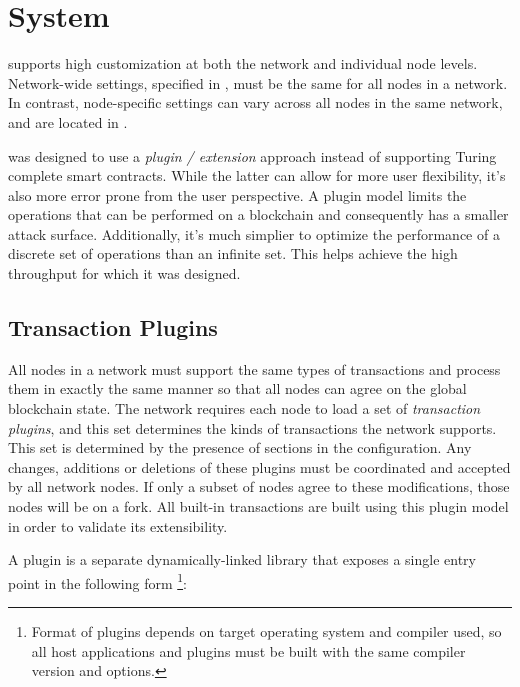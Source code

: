 \section{System}
\label{sec:system}


\codenamechapterfirstword supports high customization at both the network and individual node levels.
Network-wide settings, specified in , must be the same for all nodes in a network.
In contrast, node-specific settings can vary across all nodes in the same network, and are located in .

\codenamespace was designed to use a \emph{plugin / extension} approach instead of supporting Turing complete smart contracts.
While the latter can allow for more user flexibility, it's also more error prone from the user perspective.
A plugin model limits the operations that can be performed on a blockchain and consequently has a smaller attack surface.
Additionally, it's much simplier to optimize the performance of a discrete set of operations than an infinite set.
This helps \codenamespace achieve the high throughput for which it was designed.

\subsection{Transaction Plugins}

All nodes in a network must support the same types of transactions and process them in exactly the same manner so that all nodes can agree on the global blockchain state.
The network requires each node to load a set of \emph{transaction plugins}, and this set determines the kinds of transactions the network supports.
This set is determined by the presence of  sections in the  configuration.
Any changes, additions or deletions of these plugins must be coordinated and accepted by all network nodes.
If only a subset of nodes agree to these modifications, those nodes will be on a fork.
All built-in \codenamespace transactions are built using this plugin model in order to validate its extensibility.

A plugin is a separate dynamically-linked library that exposes a single entry point in the following form
\footnote{Format of plugins depends on target operating system and compiler used, so all host applications and plugins must be built with the same compiler version and options.}:

